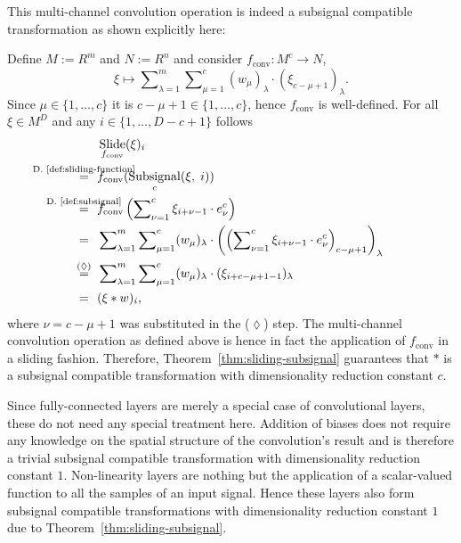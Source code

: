 \documentclass[journal]{IEEEtran}
\newcommand{\conv}{\ast}
\newcommand{\discint}[2]{\{#1,\dotsc,#2\}}
\newcommand{\inint}[2]{\in\discint{#1}{#2}}
\DeclareMathOperator{\convop}{conv}
\DeclareMathOperator{\Subsignal}{Subsignal}
\DeclareMathOperator{\Slide}{Slide}
\newcommand{\equsing}[1]{\overset{\mathclap{\text{#1}}}{=}}
\begin{document}
This multi-channel convolution operation is indeed a subsignal compatible transformation as shown explicitly here:
\begin{example}
Define $M := R^m$ and $N := R^n$ and consider $f_{\convop}\colon M^c\to N$,
\begin{displaymath}
  \xi\mapsto\sum\nolimits_{\lambda = 1}^m\sum\nolimits_{\mu = 1}^c (w_\mu)_\lambda \cdot (\xi_{c - \mu + 1})_\lambda\text{.}
\end{displaymath}
Since $\mu\inint{1}{c}$ it is $c - \mu + 1\inint{1}{c}$, hence $f_{\convop}$ is well-defined.
For all $\xi\in M^D$ and any $i\inint{1}{D - c + 1}$ follows
\begin{align*}
     & \Slide_{f_{\convop}}(\xi)_i\\
  \equsing{D.~\ref{def:sliding-function}}\ \ &f_{\convop}(\Subsignal_c(\xi,\;i))\\
  \equsing{D.~\ref{def:subsignal}}\ \ &f_{\convop}\left(\sum\nolimits_{\nu = 1}^c \xi_{i + \nu - 1}\cdot e_\nu^c\right)\\
  =\ \ &\sum\nolimits_{\lambda = 1}^m\sum\nolimits_{\mu = 1}^c (w_\mu)_\lambda \cdot \left(\left(\sum\nolimits_{\nu = 1}^c \xi_{i + \nu - 1}\cdot e_\nu^c\right)_{c - \mu + 1}\right)_\lambda\\
  \equsing{($\lozenge$)}\ \ &\sum\nolimits_{\lambda = 1}^m\sum\nolimits_{\mu = 1}^c (w_\mu)_\lambda \cdot (\xi_{i + c - \mu + 1 - 1})_\lambda\\
  =\ \ &(\xi\conv w)_i\text{,}
\end{align*}
where $\nu = c - \mu + 1$ was substituted in the ($\lozenge$) step.
The multi-channel convolution operation as defined above is hence in fact the application of $f_{\convop}$ in a sliding fashion.
Therefore, Theorem~\ref{thm:sliding-subsignal} guarantees that $\conv$ is a subsignal compatible transformation with dimensionality reduction constant $c$.
\end{example}

Since fully-connected layers are merely a special case of convolutional layers, these do not need any special treatment here.
Addition of biases does not require any knowledge on the spatial structure of the convolution's result and is therefore a trivial subsignal compatible transformation with dimensionality reduction constant $1$.
Non-linearity layers are nothing but the application of a scalar-valued function to all the samples of an input signal.
Hence these layers also form subsignal compatible transformations with dimensionality reduction constant $1$ due to Theorem~\ref{thm:sliding-subsignal}.
\end{document}

